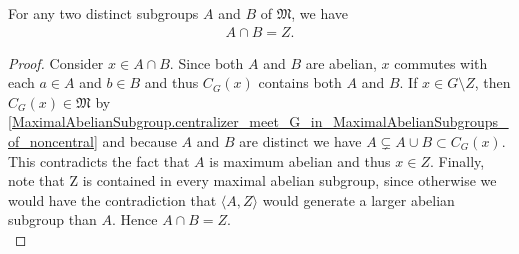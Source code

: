 \begin{theorem}
  \label{MaximalAbelianSubgroup.center_eq_meet_of_ne_MaximalAbelianSubgroups}
For any two distinct subgroups $A$ and $B$ of $\mathfrak{M}$, we have
\begin{align*} A \cap B = Z. \end{align*}
\end{theorem}
\begin{proof}
  \leanok
  Consider $x \in A \cap B$. Since both $A$ and $B$ are abelian, $x$ commutes with each $a \in A$ and $b \in B$ and thus $C_G(x)$ contains both $A$ and $B$.  If $x \in G \setminus Z$, then $C_G(x) \in \mathfrak{M}$ by \ref{MaximalAbelianSubgroup.centralizer_meet_G_in_MaximalAbelianSubgroups_of_noncentral} and because $A$ and $B$ are distinct we have $A \subsetneq A \cup B \subset C_G(x)$. 
  This contradicts the fact that $A$ is maximum abelian and thus $x \in Z$. Finally, note that Z is contained in every maximal abelian subgroup, since otherwise we would have the contradiction that $\langle A, Z \rangle$ would generate a larger abelian subgroup than $A$. Hence $A \cap B = Z$. \\
\end{proof}
